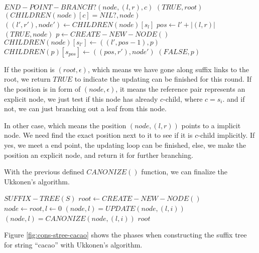 \documentclass{article}
\begin{document}
\begin{algorithmic}
\STATE $END-POINT-BRANCH?(node, (l, r), c)$
      \RETURN $(TRUE, root)$
    \ELSE
      \RETURN $(CHILDREN(node)[c] = NIL?, node)$
    \ENDIF
  \ELSE
    \STATE $((l', r'), node') \leftarrow CHILDREN(node)[s_l]$
    \STATE $pos \leftarrow l'+|(l, r)|$
      \RETURN $(TRUE, node)$
    \ELSE
      \STATE $p \leftarrow CREATE-NEW-NODE()$
      \STATE $CHILDREN(node)[s_{l'}] \leftarrow ((l', pos-1), p)$
      \STATE $CHILDREN(p)[s_{pos}] \leftarrow ((pos, r'), node')$
      \RETURN $(FALSE, p)$
    \ENDIF
  \ENDIF
\end{algorithmic}

If the position is $(root, \epsilon)$, which means we have gone along suffix links to
the root, we return $TRUE$ to indicate the updating can be finished for this round.
If the position is in form of $(node, \epsilon)$, it means the reference pair represents
an explicit node, we just test if this node has already $c$-child, where $c=s_i$. and
if not, we can just branching out a leaf from this node.

In other case, which means the position $(node, (l, r))$ points to a implicit node.
We need find the exact position next to it to see if it is $c$-child implicitly.
If yes, we meet a end point, the updating loop can be finished, else, we make
the position an explicit node, and return it for further branching.

With the previous defined $CANONIZE()$ function, we can finalize the Ukkonen's algorithm.

\begin{algorithmic}
\STATE $SUFFIX-TREE(S)$
  \STATE $root \leftarrow CREATE-NEW-NODE()$
  \STATE $node \leftarrow root, l \leftarrow 0$
    \STATE $(node, l) = UPDATE(node, (l, i))$
    \STATE $(node, l) = CANONIZE(node, (l, i))$
  \ENDFOR
  \RETURN $root$
\end{algorithmic}

Figure \ref{fig:cons-stree-cacao} shows the phases when constructing the
suffix tree for string ``cacao'' with Ukkonen's algorithm.
\end{document}
